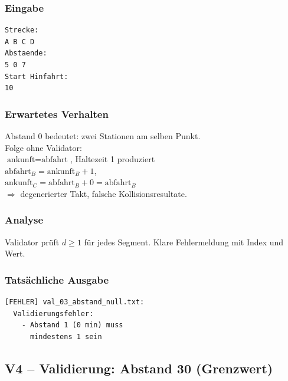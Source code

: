 \documentclass[12pt,a4paper]{article}
\begin{document}
\noindent
\begin{minipage}[t]{0.48\textwidth}
\scriptsize
\setlength{\tabcolsep}{2pt}

\subsubsection*{Eingabe}
\begin{lstlisting}
Strecke:
A B C D
Abstaende:
5 0 7
Start Hinfahrt:
10
\end{lstlisting}

\subsubsection*{Erwartetes Verhalten}
Abstand 0 bedeutet: zwei Stationen am selben Punkt.\\
Folge ohne Validator:\\
$\text{ankunft} = \text{abfahrt}$, Haltezeit 1 produziert\\
$\text{abfahrt}_{B} = \text{ankunft}_{B} + 1$,\\
$\text{ankunft}_{C} = \text{abfahrt}_{B} + 0 = \text{abfahrt}_{B}$\\
$\Rightarrow$ degenerierter Takt, falsche Kollisionsresultate.

\subsubsection*{Analyse}
Validator prüft $d \geq 1$ für jedes Segment.
Klare Fehlermeldung mit Index und Wert.
\end{minipage}
\hfill
\begin{minipage}[t]{0.48\textwidth}
\scriptsize
\subsubsection*{Tatsächliche Ausgabe}
\begin{lstlisting}
[FEHLER] val_03_abstand_null.txt:
  Validierungsfehler:
    - Abstand 1 (0 min) muss
      mindestens 1 sein
\end{lstlisting}
\end{minipage}

\subsection{V4 – Validierung: Abstand 30 (Grenzwert)}
\label{test:v4}
\end{document}
